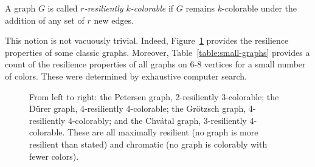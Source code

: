 \begin{problem} 
A graph $G$ is called \emph{$r$-resiliently $k$-colorable} if $G$ remains
$k$-colorable under the addition of any set of $r$ new edges.
\end{problem}

This notion is not vacuously trivial. Indeed, Figure~\ref{fig:famous-graphs}
provides the resilience properties of some classic graphs. Moreover,
Table~\ref{table:small-graphs} provides a count of the resilience properties of
all graphs on 6-8 vertices for a small number of colors. These were determined
by exhaustive computer search.

\begin{figure}[bt]
\centering
{}
\caption{From left to right: the Petersen graph, 2-resiliently 3-colorable; the
D{\"u}rer graph, 4-resiliently 4-colorable; the Gr{\"o}tzsch graph,
4-resiliently 4-colorably; and the Chv{\'a}tal graph, 3-resiliently
4-colorable. These are all maximally resilient (no graph is more resilient than
stated) and chromatic (no graph is colorably with fewer colors).}
\label{fig:famous-graphs}
\end{figure}

